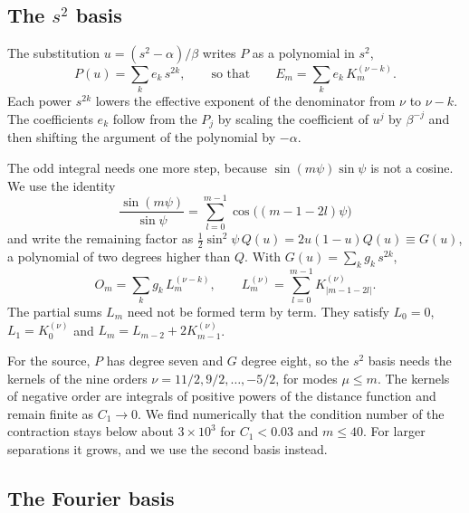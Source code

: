 \documentclass[11pt]{article}
\newcommand{\Kmn}[2]{K_{#1}^{(#2)}}
\begin{document}
\subsection{The \texorpdfstring{$s^2$}{s squared} basis}

The substitution $u=(s^2-\alpha)/\beta$ writes $P$ as a polynomial in $s^2$,
\begin{equation}
  \label{eq:s2basis}
  P(u) = \sum_k e_k\,s^{2k}, \qquad\text{so that}\qquad E_m = \sum_k e_k\,\Kmn{m}{\nu-k}.
\end{equation}
Each power $s^{2k}$ lowers the effective exponent of the denominator from $\nu$
to $\nu-k$. The coefficients $e_k$ follow from the $P_j$ by scaling the
coefficient of $u^j$ by $\beta^{-j}$ and then shifting the argument of the
polynomial by $-\alpha$.

The odd integral needs one more step, because $\sin(m\psi)\sin\psi$ is not a
cosine. We use the identity
\begin{equation}
  \label{eq:chebyshev}
  \frac{\sin(m\psi)}{\sin\psi}=\sum_{l=0}^{m-1}\cos\bigl((m-1-2l)\psi\bigr)
\end{equation}
and write the remaining factor as
$\tfrac12\sin^2\psi\,Q(u) = 2u(1-u)Q(u)\equiv G(u)$, a polynomial of two
degrees higher than $Q$. With $G(u)=\sum_k g_k\,s^{2k}$,
\begin{equation}
  \label{eq:odd_s2}
  O_m = \sum_k g_k\,L_m^{(\nu-k)}, \qquad
  L_m^{(\nu)} = \sum_{l=0}^{m-1}\Kmn{|m-1-2l|}{\nu} .
\end{equation}
The partial sums $L_m$ need not be formed term by term. They satisfy
$L_0=0$, $L_1=\Kmn{0}{\nu}$ and $L_m=L_{m-2}+2\Kmn{m-1}{\nu}$.

For the source, $P$ has degree seven and $G$ degree eight, so the $s^2$ basis
needs the kernels of the nine orders $\nu=11/2,9/2,\dots,-5/2$, for modes
$\mu\le m$. The kernels of negative order are integrals of positive powers of
the distance function and remain finite as $C_1\to0$. We find numerically that
the condition number of the contraction stays below about $3\times10^3$ for
$C_1<0.03$ and $m\le40$. For larger separations it grows, and we use the
second basis instead.

\subsection{The Fourier basis}
\end{document}
